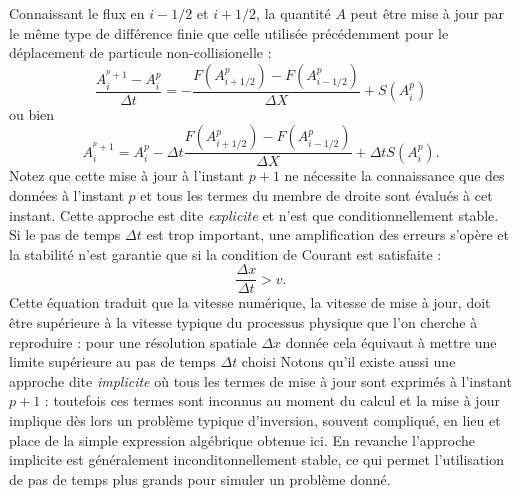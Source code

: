  Connaissant le flux en $i-1/2$ et $i+1/2$, la quantité $A$ peut être mise à jour par le même type de différence finie que celle utilisée précédemment pour le déplacement de particule non-collisionelle :
 \begin{equation}
 \frac{A_i^{^p+1}-A_i^p}{\Delta t}=-\frac{F(A_{i+1/2}^p)-F(A_{i-1/2}^p)}{\Delta X}+S(A_i^p)
 \end{equation}
 ou bien
 \begin{equation}
 A_i^{^p+1}=A_i^p-\Delta t \frac{F(A_{i+1/2}^p)-F(A_{i-1/2}^p)}{\Delta X}+\Delta t S(A_i^p).
 \end{equation}
Notez que cette mise à jour à l'instant $p+1$ ne nécessite la connaissance que des données à l'instant $p$ et tous les termes du membre de droite sont évalués à cet instant. Cette approche est dite \textit{explicite} et n'est que conditionnellement stable. Si le pas de temps $\Delta t$ est trop important, une amplification des erreurs s'opère et la stabilité n'est garantie que si la condition de Courant est satisfaite :
\begin{equation}
\frac{\Delta x}{ \Delta t}> v.
\end{equation}
Cette équation traduit que la vitesse numérique, la vitesse de mise à jour, doit être supérieure à la vitesse typique du processus physique que l'on cherche à reproduire : pour une résolution spatiale $\Delta x$ donnée cela équivaut à mettre une limite supérieure au pas de temps $\Delta t$ choisi  Notons qu'il existe aussi une approche dite \textit{implicite} où tous les termes de mise à jour sont exprimés à l'instant $p+1$ : toutefois ces termes sont inconnus au moment du calcul et la mise à jour implique dès lors un problème typique d'inversion, souvent compliqué, en lieu et place de la simple expression algébrique obtenue ici. En revanche l'approche implicite est généralement inconditonnellement stable, ce qui permet l'utilisation de pas de temps plus grands pour simuler un problème donné.

